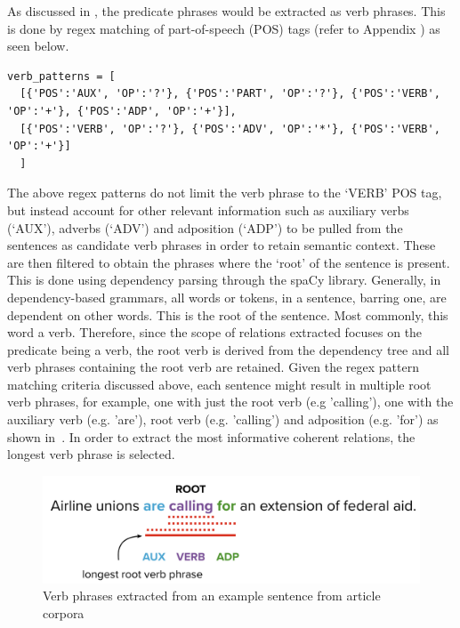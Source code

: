 As discussed in , the predicate phrases would be extracted as verb phrases. This is done by regex matching of part-of-speech (POS) tags (refer to Appendix ) as seen below. 

\begin{verbatim}
verb_patterns = [
  [{'POS':'AUX', 'OP':'?'}, {'POS':'PART', 'OP':'?'}, {'POS':'VERB', 'OP':'+'}, {'POS':'ADP', 'OP':'+'}],
  [{'POS':'VERB', 'OP':'?'}, {'POS':'ADV', 'OP':'*'}, {'POS':'VERB', 'OP':'+'}]
  ]
\end{verbatim}


The above regex patterns do not limit the verb phrase to the `VERB' POS tag, but instead account for other relevant information such as auxiliary verbs (`AUX'), adverbs (`ADV') and adposition (`ADP') to be pulled from the sentences as candidate verb phrases in order to retain semantic context. These are then filtered to obtain the phrases where the `root' of the sentence is present. This is done using dependency parsing through the spaCy library. Generally, in dependency-based grammars, all words or tokens, in a sentence,  barring one,  are dependent on other words.  This is the root  of the sentence. Most commonly, this word a verb. Therefore, since the scope of relations extracted focuses on the predicate being a verb, the root verb is derived from the dependency tree and all verb phrases containing the root verb are retained. Given the regex pattern matching criteria discussed above, each sentence might result in multiple root verb phrases, for example, one with just the root verb (e.g 'calling'), one with the auxiliary verb (e.g. 'are'), root verb (e.g. 'calling') and adposition (e.g. 'for') as shown in~. In order to extract the most informative coherent relations, the longest verb phrase is selected. 

\begin{figure}[H]
\centering
\includegraphics[scale=0.35]{images/verb_phrases.png}
\caption{Verb phrases extracted from an example sentence from article corpora}
\label{verb_phrases}
\end{figure}

